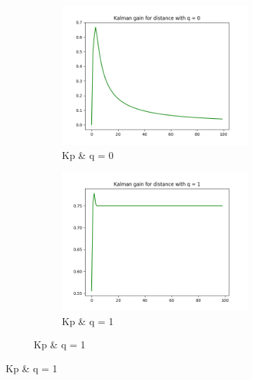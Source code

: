 \documentclass{article}
\begin{document}
        \begin{figure}[H]
            \centering 
            \begin{subfigure}{1\textwidth}  
                \begin{subfigure}{.3\textwidth}  
                    \includegraphics[width=1\linewidth]{./img/k11_0.png}
                    \caption{Kp \& q = 0 }
                \end{subfigure}
                \begin{subfigure}{.3\textwidth}  
                    \includegraphics[width=1\linewidth]{./img/k11_1.png}
                    \caption{Kp \& q = 1 }
                \end{subfigure}

\end{subfigure}
\end{figure}
\end{document}
